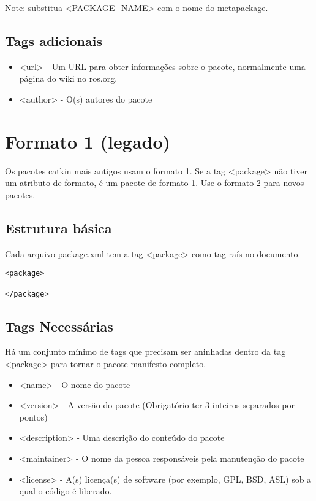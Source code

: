 Note: substitua <PACKAGE\_NAME> com o nome do metapackage.

\subsection{Tags adicionais}

\begin{itemize}
	\setlength{\itemsep}{1pt}
	\setlength{\parskip}{0pt}
	\setlength{\parsep}{0pt}
	\item [] <url> - 
	Um URL para obter informações sobre o pacote, normalmente uma página do wiki no ros.org.
	\item [] <author> - O(s) autores do pacote
\end{itemize}

\section{Formato 1 (legado)}

Os pacotes catkin mais antigos usam o formato 1. Se a tag <package> não tiver um atributo de formato, é um pacote de formato 1. Use o formato 2 para novos pacotes.

\subsection{Estrutura básica}

Cada arquivo package.xml tem a tag <package> como tag raís no documento.

\begin{verbatim}
<package>

</package>
\end{verbatim}

\subsection{Tags Necessárias}

Há um conjunto mínimo de tags que precisam ser aninhadas dentro da tag <package> para tornar o pacote manifesto completo.

\begin{itemize}
	\setlength{\itemsep}{1pt}
	\setlength{\parskip}{0pt}
	\setlength{\parsep}{0pt}
	\item [] <name> - O nome do pacote
	\item []<version> - A versão do pacote (Obrigatório ter 3 inteiros separados por pontos)
	\item []<description> - Uma descrição do conteúdo do pacote
	\item []<maintainer> - O nome da pessoa responsáveis pela manutenção do pacote
	\item []<license> - A(s) licença(s) de software (por exemplo, GPL, BSD, ASL) sob a qual o código é liberado.
\end{itemize}


